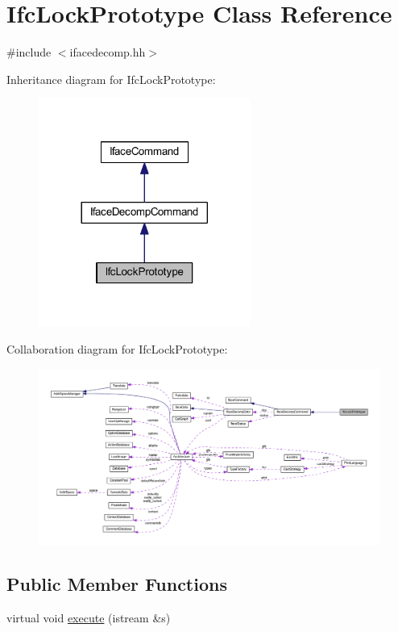 \hypertarget{class_ifc_lock_prototype}{}\section{Ifc\+Lock\+Prototype Class Reference}
\label{class_ifc_lock_prototype}


{\ttfamily \#include $<$ifacedecomp.\+hh$>$}



Inheritance diagram for Ifc\+Lock\+Prototype\+:
\nopagebreak
\begin{figure}[H]
\begin{center}
\leavevmode
\includegraphics[width=197pt]{class_ifc_lock_prototype__inherit__graph}
\end{center}
\end{figure}


Collaboration diagram for Ifc\+Lock\+Prototype\+:
\nopagebreak
\begin{figure}[H]
\begin{center}
\leavevmode
\includegraphics[width=350pt]{class_ifc_lock_prototype__coll__graph}
\end{center}
\end{figure}
\subsection*{Public Member Functions}
\begin{DoxyCompactItemize}
\item 
virtual void \mbox{\hyperlink{class_ifc_lock_prototype_aa2e82ff8df04101dcee268fca0f0f1b4}{execute}} (istream \&s)
\end{DoxyCompactItemize}
